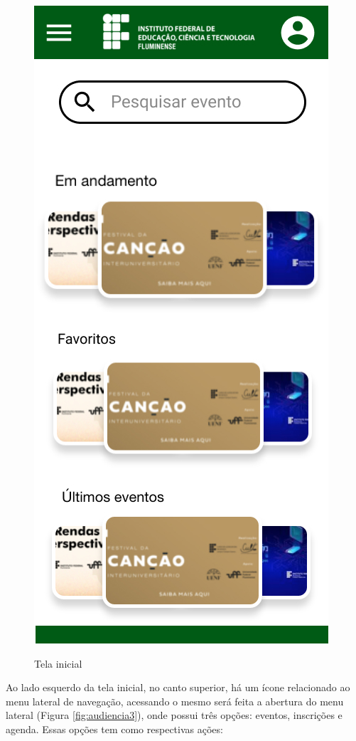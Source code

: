 \begin{figure}[H]
    \centering
    \caption{Tela inicial}
    \includegraphics[scale=0.44]{figuras/Audiencia/2-TelaPrincipal.jpg}
    \label{fig:audiencia2}
\end{figure}

Ao lado esquerdo da tela inicial, no canto superior, há um ícone relacionado ao menu lateral de navegação, acessando o mesmo será feita a abertura do menu lateral (Figura \ref{fig:audiencia3}), onde possui três opções: eventos, inscrições e agenda. Essas opções tem como respectivas ações:


